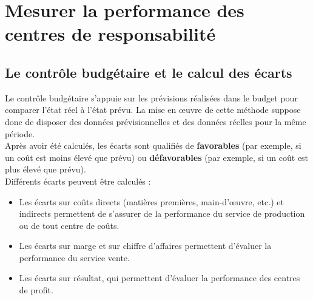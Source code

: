 \documentclass{kaobook}
\begin{document}
\section{Mesurer la performance des centres de responsabilité}
\label{sec:orgcfc9042}
\subsection{Le contrôle budgétaire et le calcul des écarts}
\label{sec:orgfbf84a9}
Le contrôle budgétaire s’appuie sur les prévisions réalisées dans le budget pour comparer l’état réel à l’état prévu. La mise en œuvre de cette méthode suppose donc de disposer des données prévisionnelles et des données réelles pour la même période.\\
Après avoir été calculés, les écarts sont qualifiés de \textbf{favorables} (par exemple, si un coût est moins élevé que prévu) ou \textbf{défavorables} (par exemple, si un coût est plus élevé que prévu).\\

Différents écarts peuvent être calculés :\\
\begin{itemize}
\item Les écarts sur coûts directs (matières premières, main-d’œuvre, etc.) et indirects permettent de s’assurer de la performance du service de production ou de tout centre de coûts.\\
\item Les écarts sur marge et sur chiffre d’affaires permettent d’évaluer la performance du service vente.\\
\item Les écarts sur résultat, qui permettent d’évaluer la performance des centres de profit.\\
\end{itemize}
\end{document}
